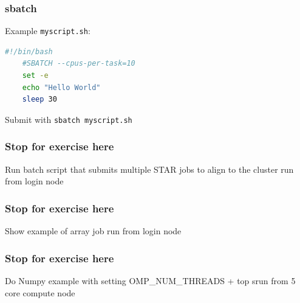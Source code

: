 \documentclass{beamer}
\newcommand{\code}[1]{\colorbox{codegray}{\texttt{#1}}}
\begin{document}
\begin{frame}[fragile]
\frametitle{sbatch}
Example \code{myscript.sh}: 
\begin{lstlisting}[backgroundcolor = \color{codegray}, language = Bash, showstringspaces=false]
    #!/bin/bash
    #SBATCH --cpus-per-task=10
    set -e
    echo "Hello World"
    sleep 30
\end{lstlisting}
\bigskip
\bigskip
Submit with \code{sbatch myscript.sh}
\end{frame}



\begin{frame}
\frametitle{Stop for exercise here}
Run batch script that submits multiple STAR jobs to align to the cluster
run from login node
\end{frame}


\begin{frame}
\frametitle{Stop for exercise here}
Show example of array job
run from login node
\end{frame}


\begin{frame}
\frametitle{Stop for exercise here}
Do Numpy example with setting OMP_NUM_THREADS + top
srun from 5 core compute node
\end{frame}





\end{document}
